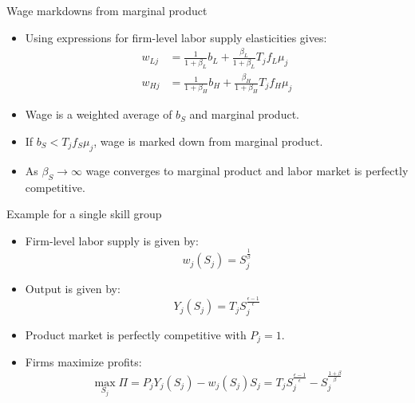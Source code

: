 \documentclass[notes=show]{beamer}
\begin{document}
\begin{frame}{Wage markdowns from marginal product}
\begin{itemize}
\item Using expressions for firm-level labor supply elasticities gives:
\begin{align*}
    w_{Lj} & = \frac{1}{1 + \beta_{L}}b_{L} + \frac{\beta_{L}}{1 + \beta_{L}} T_{j} f_{L} \mu_{j} \tag{10} \\
    w_{Hj} & = \frac{1}{1 + \beta_{H}}b_{H} + \frac{\beta_{H}}{1 + \beta_{H}} T_{j} f_{H} \mu_{j} \tag{11}
\end{align*}
\item Wage is a weighted average of $b_{S}$ and marginal product. \medskip
\item If $ b_{S} < T_{j} f_{S} \mu_{j} $, wage is marked down from marginal product. \medskip
\item As $ \beta_{S} \rightarrow \infty $ wage converges to marginal product and labor market is perfectly competitive.
\end{itemize}
\end{frame}

\begin{frame}{Example for a single skill group}
\begin{itemize}
\item Firm-level labor supply is given by:
\begin{equation*}
    w_{j}(S_{j}) = S_{j}^{\frac{1}{\beta}}
\end{equation*}
\item Output is given by:
\begin{equation*}
    Y_{j}(S_{j}) = T_{j} S_{j}^{\frac{\epsilon - 1}{\epsilon}}
\end{equation*}
\item Product market is perfectly competitive with $P_{j}=1$. \medskip
\item Firms maximize profits:
\begin{equation*}
    \max_{S_{j}} \Pi = P_{j} Y_{j}(S_{j}) - w_{j}(S_{j}) S_{j} = T_{j}S_{j}^{\frac{\epsilon - 1}{\epsilon}} - S_{j}^{\frac{1 + \beta}{\beta}} 
\end{equation*}
\end{itemize}
\end{frame}
\end{document}

